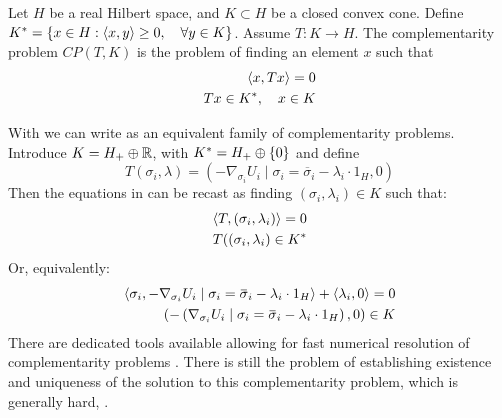 \begin{definition}
  \label{def:comp_prob}
  Let $H$ be a real Hilbert space, and $K \subset H$ be a closed convex cone. Define $K^* = \{ x \in H : \left \langle x,y \right \rangle \geq 0, \quad \forall y\in K\} $. Assume $T:K \to H$. The complementarity problem $CP(T,K)$ is the problem of finding an element $x$ such that
  \begin{equation}
    \begin{split}
    \left \langle x,Tx \right \rangle = 0 \\
    Tx \in K^*, \quad  x\in K
  \end{split}
  \end{equation}
\end{definition}
With  we can write  as an equivalent family of complementarity problems. Introduce $K = H_+ \oplus \mathbb{R}$, with $K^* = H_+ \oplus \{0\}$ and define
\begin{equation}
  T(\sigma_i, \lambda) = (-\nabla_{\sigma_i} U_i \mid{\sigma_i = \overbar{\sigma}_i} - \lambda_i \cdot 1_H, 0)
\end{equation}
Then the equations in  can be recast as finding $(\sigma_i,\lambda_i) \in K$ such that:
\begin{equation}
  \label{eq:comp_form}
  \begin{split}
    \left \langle T,(\sigma_i,\lambda_i) \right \rangle = 0 \\
    T((\sigma_i,\lambda_i) \in K^*
  \end{split}
\end{equation}
Or, equivalently:
\begin{equation}
  \begin{split}
    \ip{\sigma_i}{-\nabla_{\sigma_i} U_i \mid{\sigma_i = \overbar{\sigma}_i} - \lambda_i \cdot 1_H} + \ip{\lambda_i}{0}= 0 \\
    \pa{-\pa{\nabla_{\sigma_i} U_i \mid{\sigma_i = \overbar{\sigma}_i} - \lambda_i \cdot 1_H}, 0} \in K
  \end{split}
\end{equation}
There are dedicated tools available allowing for fast numerical resolution of complementarity problems \citep{acary2019introduction, dirkse1995path}. There is still the problem of establishing existence and uniqueness of the solution to this complementarity problem, which is generally hard, \citep{hadjisavvas2006handbook}.



